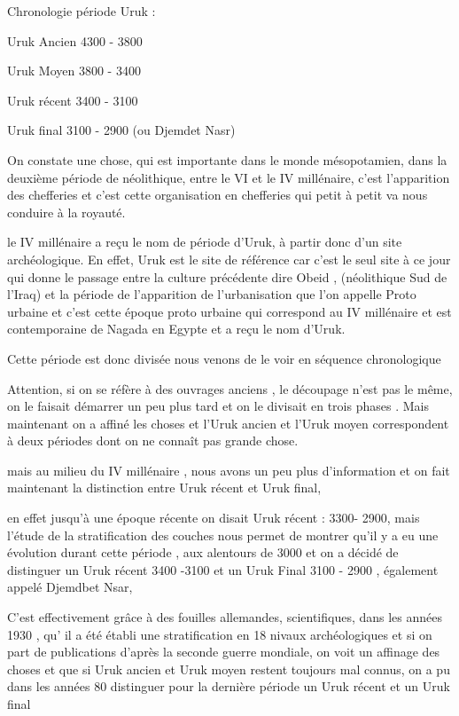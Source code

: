 \documentclass[a4paper,10pt]{article}
\begin{document}
Chronologie période Uruk : 

Uruk Ancien 4300 - 3800

Uruk Moyen 3800 - 3400

Uruk récent  3400 - 3100

Uruk final  3100 - 2900 (ou Djemdet Nasr)

On constate une chose, qui est importante dans le monde mésopotamien,
dans la deuxième période de néolithique, entre le VI et le IV
millénaire, c'est l'apparition des
chefferies et c'est cette organisation en chefferies
qui petit à petit va nous conduire à la royauté.

le IV millénaire a reçu le nom de période d'Uruk,  à
partir donc d'un site archéologique. En effet, Uruk
est le site de référence car c'est le seul site à ce
jour qui donne le passage entre la culture précédente dire Obeid ,
(néolithique Sud de l'Iraq) et la période de
l'apparition de l'urbanisation que
l'on appelle Proto  urbaine et c'est
cette époque proto urbaine qui correspond au IV millénaire et est
contemporaine de Nagada en Egypte et a reçu le nom
d'Uruk.

Cette période est donc divisée nous venons de le voir en séquence
chronologique

Attention, si on se réfère à des ouvrages anciens , le découpage
n'est pas le même, on le faisait démarrer un peu plus
tard et on le divisait en trois phases . Mais maintenant on a affiné
les choses et l'Uruk ancien et l'Uruk
 moyen correspondent à deux périodes dont on ne connaît pas grande
chose.

mais au milieu du IV millénaire , nous avons un peu plus
d'information et on fait maintenant la distinction
entre Uruk récent et Uruk final,

en effet jusqu'à une époque récente on disait Uruk
récent : 3300- 2900, mais l'étude de la stratification
des couches nous permet de montrer qu'il y a eu une
évolution durant cette période , aux alentours de 3000 et on a décidé
de distinguer un Uruk récent 3400 -3100 et un Uruk Final 3100 - 2900 ,
également appelé Djemdbet Nsar, 

C'est effectivement grâce à des fouilles allemandes,
scientifiques, dans les années 1930 , qu' il a été
établi une stratification en 18 nivaux archéologiques et si on part de
publications d'après la seconde guerre mondiale, on
voit un affinage des choses et que si Uruk ancien et Uruk moyen restent
toujours mal connus, on a pu dans les années 80 distinguer pour la
dernière période un Uruk récent et un Uruk final
\end{document}
